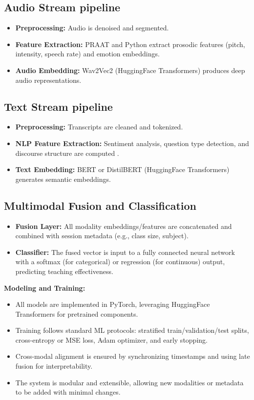 \subsection{Audio Stream pipeline}  
\begin{itemize}
    \item \textbf{Preprocessing:} Audio is denoised and segmented.
    \item \textbf{Feature Extraction:} PRAAT and Python extract prosodic features (pitch, intensity, speech rate) and emotion embeddings.
    \item \textbf{Audio Embedding:} Wav2Vec2 (HuggingFace Transformers) produces deep audio representations.
\end{itemize}

\subsection{Text Stream pipeline}  
\begin{itemize}
    \item \textbf{Preprocessing:} Transcripts are cleaned and tokenized.
    \item \textbf{NLP Feature Extraction:} Sentiment analysis, question type detection, and discourse structure are computed \cite{sinclair1975discourse}.
    \item \textbf{Text Embedding:} BERT or DistilBERT (HuggingFace Transformers) generates semantic embeddings.
\end{itemize}

\subsection{Multimodal Fusion and Classification}  
\begin{itemize}
    \item \textbf{Fusion Layer:} All modality embeddings/features are concatenated and combined with session metadata (e.g., class size, subject).
    \item \textbf{Classifier:} The fused vector is input to a fully connected neural network with a softmax (for categorical) or regression (for continuous) output, predicting teaching effectiveness.
\end{itemize}

\textbf{Modeling and Training:}  
\begin{itemize}
    \item All models are implemented in PyTorch, leveraging HuggingFace Transformers for pretrained components.
    \item Training follows standard ML protocols: stratified train/validation/test splits, cross-entropy or MSE loss, Adam optimizer, and early stopping.
    \item Cross-modal alignment is ensured by synchronizing timestamps and using late fusion for interpretability.
    \item The system is modular and extensible, allowing new modalities or metadata to be added with minimal changes.
\end{itemize}

